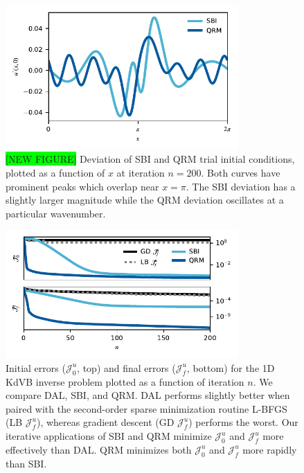 \documentclass[%
 reprint,
 amsmath,amssymb,
 aps,
 pre,
]{revtex4-2}
\newcommand{\Juo}{\mathcal{J}^{u}_0}
\newcommand{\Juf}{\mathcal{J}^{u}_f}
\begin{document}
\begin{figure}
  \centering
  \includegraphics[width=3.5in]{diff_plot/approx.pdf}
  \caption{\colorbox{lime}{[NEW FIGURE]} Deviation of SBI and QRM trial initial conditions, plotted as a function of $x$ at iteration $n=200$. 
  Both curves have prominent peaks which overlap near $x=\pi$. 
  The SBI deviation has a slightly larger magnitude while the QRM deviation oscillates at a particular wavenumber.}
  \label{kdvb_diff}
\end{figure}

\begin{figure}
  \centering
  \includegraphics[width=3.5in]{PLTC/all.pdf}
  \caption{Initial errors ($\Juo$, top) and final errors ($\Juf$, bottom) for the 1D KdVB inverse problem plotted as a function of iteration $n$.
  We compare DAL, SBI, and QRM. 
  DAL performs slightly better when paired with the second-order sparse minimization routine L-BFGS (LB $\Juf$), whereas gradient descent (GD $\Juf$) performs the worst.
  Our iterative applications of SBI and QRM minimize $\Juo$ and $\Juf$ more effectively than DAL. 
  QRM minimizes both $\Juo$ and $\Juf$ more rapidly than SBI.}
  \label{kdvb_optimize}
\end{figure}
\end{document}
